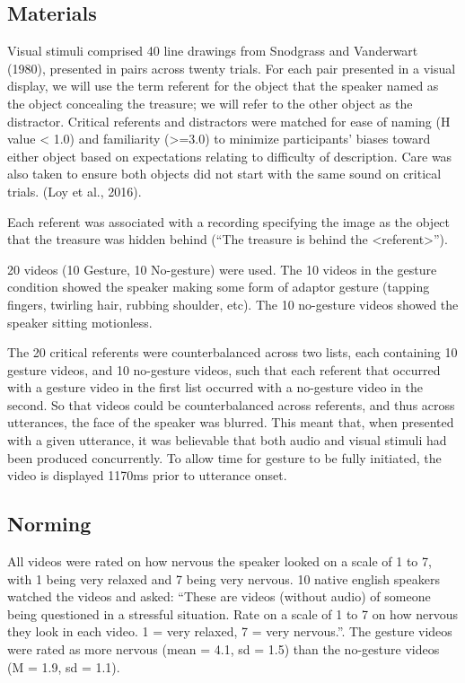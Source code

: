 \documentclass[a4paper,man,natbib]{apa6}
\begin{document}
\subsection{Materials}
Visual stimuli comprised 40 line drawings from Snodgrass and Vanderwart (1980), presented in pairs across twenty trials. For each pair presented in a visual display, we will use the term referent for the object that the speaker named as the object concealing the treasure; we will refer to the other object as the distractor. Critical referents and distractors were matched for ease of naming (H value < 1.0) and familiarity (>=3.0) to minimize participants’ biases toward either object based on expectations relating to difficulty of description. Care was also taken to ensure both objects did not start with the same sound on critical trials. (Loy et al., 2016).

Each referent was associated with a recording specifying the image as the object that the treasure was hidden behind (“The treasure is behind the <referent>”).

20 videos (10 Gesture, 10 No-gesture) were used.
The 10 videos in the gesture condition showed the speaker making some form of adaptor gesture (tapping fingers, twirling hair, rubbing shoulder, etc).
The 10 no-gesture videos showed the speaker sitting motionless. 

The 20 critical referents were counterbalanced across two lists, each containing 10 gesture videos, and 10 no-gesture videos, such that each referent that occurred with a gesture video in the first list occurred with a no-gesture video in the second.
So that videos could be counterbalanced across referents, and thus across utterances, the face of the speaker was blurred. This meant that, when presented with a given utterance, it was believable that both audio and visual stimuli had been produced concurrently. 
To allow time for gesture to be fully initiated, the video is displayed 1170ms prior to utterance onset. 

\subsection{Norming}
All videos were rated on how nervous the speaker looked on a scale of 1 to 7, with 1 being very relaxed and 7 being very nervous.
10 native english speakers watched the videos and asked: “These are videos (without audio) of someone being questioned in a stressful situation. Rate on a scale of 1 to 7 on how nervous they look in each video. 1 = very relaxed, 7 = very nervous.”.
The gesture videos were rated as more nervous (mean = 4.1, sd = 1.5) than the no-gesture videos (M = 1.9, sd = 1.1).
\end{document}

